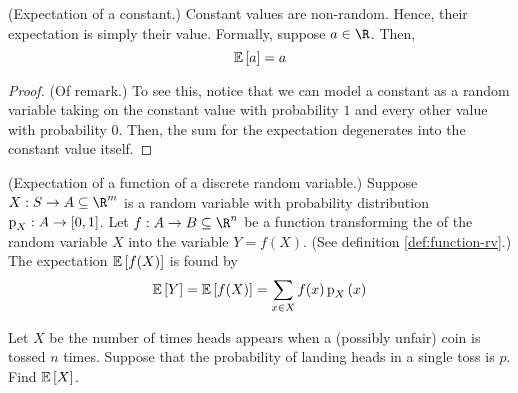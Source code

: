\documentclass[11pt]{article}
\begin{document}
\begin{rem}{(Expectation of a constant.)}
    Constant values are non-random. Hence, their expectation is simply their
    value. Formally, suppose $a \in \R$. Then,
    \begin{equation*}
        \operatorname{\mathbb{E}}{\left[a\right]} = a
    \end{equation*}
\end{rem}

\begin{proof}{(Of remark.)}
    To see this, notice that we can model a constant as a random variable
    taking on the constant value with probability $1$ and every other value
    with probability $0$. Then, the sum for the expectation degenerates into
    the constant value itself.
\end{proof}

\begin{thm}{(Expectation of a function of a discrete random variable.)}
    \label{thm:expectation-function-rv}
    Suppose $X : S \to A \subseteq \R^m$ is a random variable with probability
    distribution $\operatorname{p}_X : A \to [0,1]$.
    Let $f : A \to B \subseteq \R^n$ be a function transforming the of the
    random variable $X$ into the variable $Y = f(X)$.
    (See definition \ref{def:function-rv}.)
    The expectation $\operatorname{\mathbb{E}}{\left[f(X)\right]}$ is found by
    \begin{equation}
        \label{eq:expectation-function-rv}
        \E{Y}
        = \E{f(X)}
        = \sum_{x \in X} {
            f(x) \p[X]{x}
        }
    \end{equation}
\end{thm}

\begin{eg}
    \label{eg:n-coin-toss-expectation}
    Let $X$ be the number of times heads appears when a (possibly unfair) coin
    is tossed $n$ times. Suppose that the probability of landing heads in a
    single toss is $p$. Find $\operatorname{\mathbb{E}}{\left[X\right]}$.
\end{eg}
\end{document}
